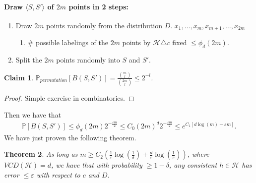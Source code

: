 \documentclass[12pt, letterpaper]{article}
\numberwithin{equation}{section} %
\newcommand{\mb}{\mathbb}
\newcommand{\mc}{\mathcal}
\newcommand{\ve}{\varepsilon}
\newtheorem{theorem}{Theorem}[section]
\newtheorem{claim}[theorem]{Claim}
\theoremstyle{definition}
\theoremstyle{remark}
\begin{document}
\paragraph{Draw $\langle S, S'\rangle$ of $2m$ points in 2 steps:}
\begin{enumerate}
\item Draw $2m$ points randomly from the distribution $D$. $x_1,\ldots, x_m, x_{m+1},\ldots, x_{2m}$
\begin{enumerate}[-]
\item \# possible labelings of the $2m$ points by $\mc H \triangle c$ fixed $\leq \phi_d(2m)$.
\end{enumerate}
\item Split the $2m$ points randomly into $S$ and $S'$.
\end{enumerate}

\begin{claim}
$\mb P_{permutation}[B\left(S, S'\right)] = \frac{\binom{m}{l}}{\binom{2m}{l}}\leq 2^{-l}$.
\end{claim}
\begin{proof}
    Simple exercise in combinatorics.
\end{proof}
Then we have that
\begin{align}
    \mb P[B\left(S, S'\right)] \leq \phi_d(2m)2^{-\frac{\ve m}2} \leq C_0 (2m)^d 2^{-\frac{\ve m}2} \leq e^{C_1[d\log(m)-\ve m]}.
\end{align}
We have just proven the following theorem.
\begin{theorem}
    As long as $m\geq C_2\left(\frac1\ve\log\left(\frac1\delta
    \right) + \frac{d}\ve\log\left(\frac1\ve\right)\right)$, where $VCD(\mc H) = d$, we have that with probability $\geq 1-\delta$, any \emph{consistent} $h\in\mc H$ has error $\leq \ve$ with respect to $c$ and $D$.
\end{theorem}
\end{document}
